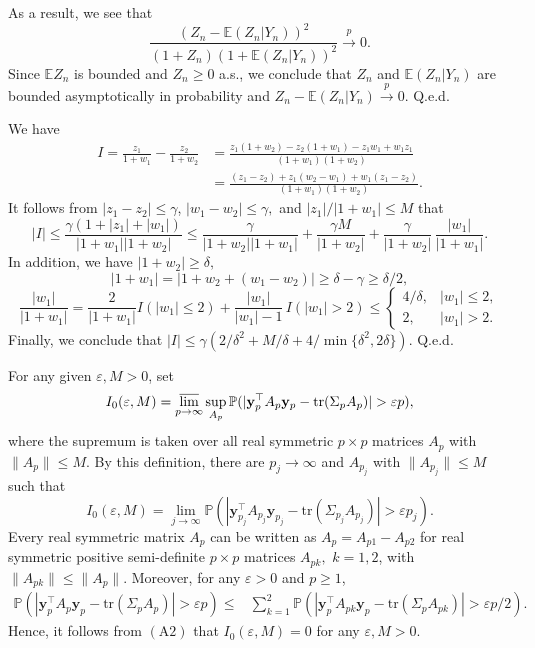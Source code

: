 \documentclass[12pt, a4paper]{article}
\newcommand\y{{\mathbf y}}
\newcommand\pto{\stackrel p\rightarrow}
\newcommand\e{{\mathbb E}}
\newcommand\p{{\mathbb P}}
\newcommand\tr{{\mathrm{tr}}}
\begin{document}
As a result, we see that 
\[\frac{(Z_n-\e (Z_n|Y_n))^2}{(1+Z_n)(1+\e (Z_n|Y_n))^2}\pto0.\]
Since $\e Z_n$ is bounded and $Z_n\geqslant 0$ a.s., we conclude that $Z_n$  and $\e(Z_n|Y_n)$ are bounded asymptotically in probability and  $Z_n-\e(Z_n|Y_n)\pto0.$ Q.e.d.


 We have
\begin{align*} I=\frac{z_1}{1+w_1}-\frac{z_2}{1+w_2}&=\frac{z_1(1+w_2)-z_2(1+w_1)-z_1w_1+w_1z_1}{(1+w_1)(1+w_2)}\\&=
\frac{(z_1-z_2)+z_1(w_2-w_1)+w_1(z_1-z_2)}{(1+w_1)(1+w_2)}.\end{align*}
It follows from $|z_1-z_2|\leqslant \gamma$, $|w_1-w_2|\leqslant \gamma,$ and $|z_1|/|1+w_1|\leqslant M$ that 
\[|I|\leqslant \frac{\gamma(1+|z_1|+|w_1|)}{|1+w_1||1+w_2|}\leqslant \frac{\gamma}{|1+w_2||1+w_1|}+\frac{\gamma M}{|1+w_2|}+\frac{\gamma}{|1+w_2|}\,\frac{|w_1|}{|1+w_1|}.\]
In addition, we have  $|1+w_2| \geqslant \delta,$
\[|1+w_1|=|1+w_2+(w_1-w_2)|\geqslant \delta-\gamma\geqslant \delta /2,\]
\[
\frac{|w_1|}{|1+w_1|}= \dfrac{2}{|1+w_1|} I(|w_1|\leqslant 2)+
\dfrac{|w_1|}{|w_1|-1}\,I(|w_1|>2)\leqslant\begin{cases}
4/\delta,& |w_1|\leqslant 2,\\
2,& |w_1|>2.\end{cases}\]
Finally, we conclude that  $|I|\leqslant \gamma(2/\delta^2+M/\delta +4/\min\{\delta^2,2\delta\}).$ Q.e.d.

 For any given  $\varepsilon,M>0$, set
\begin{equation}\label{IM}
I_0(\varepsilon,M)=\varlimsup_{p\to\infty}\sup_{A_p}\p(|\y_p^\top A_p \y_p-\tr(\Sigma_p A_p)|>\varepsilon p),
\end{equation} 
where the supremum is taken over all  real  symmetric $p\times p$ matrices $A_p$ with  $\|A_p\|\leqslant M.$  By this definition, there are $p_j\to\infty$ and $A_{p_j}$ with $\|A_{p_j}\|\leqslant M$  such that 
\[I_0(\varepsilon,M)=\lim_{j\to\infty}\p(|\y_{p_j}^\top A_{p_j} \y_{p_j}-\tr(\Sigma_{p_j}A_{p_j})|>\varepsilon p_j).\] 
Every real symmetric matrix $A_p$ can be written as $A_p=A_{p1}-A_{p2}$ for real symmetric positive semi-definite $p\times p$ matrices $A_{pk},$ $k=1,2$, with $\|A_{pk}\|\leqslant \|A_p\|$. Moreover,
for any $\varepsilon>0$ and $p\geqslant 1$,
\begin{align} \label{ineq}
\p(|\y_p^\top A_p \y_p-\tr(\Sigma_p A_p)|>\varepsilon p)\leqslant &\sum_{k=1}^2 \p(|\y_p^\top A_{pk} \y_p-\tr(\Sigma_p A_{pk})|>\varepsilon p/2) .\end{align}
Hence, it follows from $(\mathrm A2)$ that $I_0(\varepsilon,M)=0$ for any $\varepsilon,M>0.$
\end{document}
